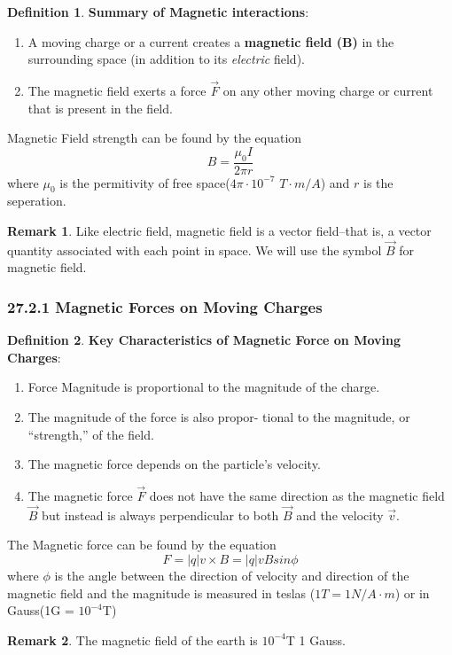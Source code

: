 \documentclass[12pt]{amsart}
\theoremstyle{definition}
\newtheorem{definition}{Definition} %
\newtheorem*{remark}{Remark}        %
\numberwithin{equation}{theorem}    %
\begin{document}
\begin{definition}
    \textbf{Summary of Magnetic interactions}:
    \begin{enumerate}
        \item A moving charge or a current creates a \textbf{magnetic field (B)} in the surrounding
        space (in addition to its \textit{electric} field).
        \item  The magnetic field exerts a force $\vec{F}$ on any other moving charge or current that is present in the field.
    \end{enumerate}

    Magnetic Field strength can be found by the equation 
    $$B = \frac{\mu_0I}{2\pi r}$$ where $\mu_0$ is the permitivity of free space($4\pi \cdot 10^{-7}$ $T\cdot m/A$) and $r$ is the seperation.

    \begin{remark}
        Like electric field, magnetic field is a vector field--that is, a vector quantity associated with each point in space. We will use the symbol $\vec{B}$ for magnetic field.
    \end{remark}
\end{definition}




\subsubsection*{27.2.1 Magnetic Forces on Moving Charges}

\begin{definition}
    \textbf{Key Characteristics of Magnetic Force on Moving Charges}:
    \begin{enumerate}
        \item Force Magnitude is proportional to the magnitude of the charge.
        \item The magnitude of the force is also propor- tional to the magnitude, or “strength,” of the field.
        \item The magnetic force depends on the particle’s
        velocity.
        \item The magnetic force $\vec{F}$ does not have the same direction as the magnetic field $\vec{B}$ but instead is always perpendicular to both $\vec{B}$ and the velocity $\vec{v}$. 
    \end{enumerate}
    The Magnetic force can be found by the equation $$F = |q|v \times B = |q|vBsin\phi$$ where $\phi$ is the angle between the direction of velocity and direction of the magnetic field and the magnitude is measured in teslas ($1T = 1N/A \cdot m$) or in Gauss(1G = $10^{-4}$T)
    \begin{remark}
        The magnetic field of the earth is $10^{-4}$T 1 Gauss.
    \end{remark}
\end{definition}
\end{document}
